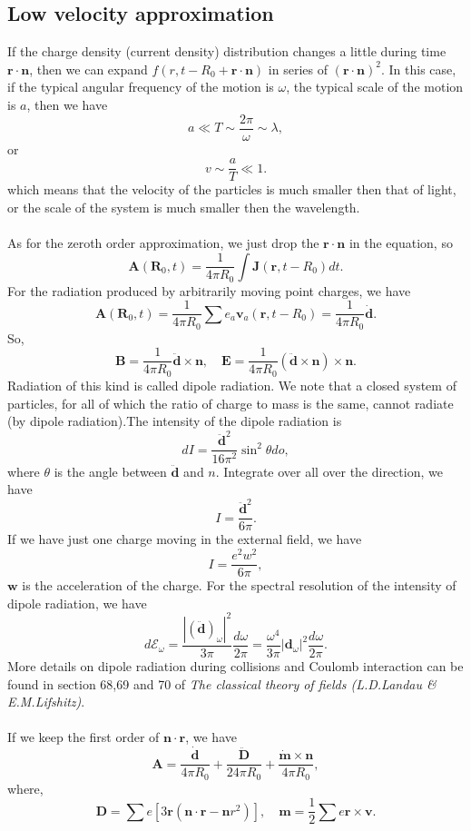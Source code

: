 \subsection{Low velocity approximation}
If the charge density (current density) distribution changes a little during time $\bm{r}\cdot\bm{n}$, then we can expand $f(r,t-R_0+\bm{r}\cdot\bm{n})$ in series of $(\bm{r}\cdot\bm{n})^2$. In this case, if the typical angular frequency of the motion is $\omega$, the typical scale of the motion is $a$, then we have
\[a \ll T \sim \frac{2\pi}{\omega} \sim \lambda,\]
or
\[v \sim \frac{a}{T} \ll 1.\]
which means that the velocity of the particles is much smaller then that of light, or the scale of the system is much smaller then the wavelength.
\\ \\
As for the zeroth order approximation, we just drop the $\bm{r}\cdot\bm{n}$ in the equation, so
\[\bm{A}(\bm{R}_0,t) = \frac{1}{4\pi R_0} \int \bm{J}(\bm{r},t-R_0) dt.\]
For the radiation produced by arbitrarily moving point charges, we have
\[\bm{A}(\bm{R}_0,t) = \frac{1}{4\pi R_0} \sum e_a \bm{v}_a(\bm{r},t-R_0) = \frac{1}{4\pi R_0} \dot{\bm{d}}.\]
So,
\[\bm{B} = \frac{1}{4\pi R_0} \ddot{\bm{d}} \times \bm{n} , \quad \bm{E} = \frac{1}{4\pi R_0} (\ddot{\bm{d}} \times \bm{n})\times \bm{n}.\]
Radiation of this kind is called dipole radiation. 
We note that a closed system of particles, for all of which the ratio of charge to mass is the same, cannot radiate (by dipole radiation).The intensity of the dipole radiation is
\[dI = \frac{\ddot{\bm{d}}^2}{16\pi^2} \sin^2\theta do,\]
where $\theta$ is the angle between $\ddot{\bm{d}}$ and $n$.
Integrate over all over the direction, we have
\[I = \frac{\ddot{\bm{d}}^2}{6\pi}.\]
If we have just one charge moving in the external field, we have
\[I = \frac{e^2 w^2}{6\pi},\]
$\bm{w}$ is the acceleration of the charge.
For the spectral resolution of the intensity of dipole radiation, we have
\[d\mathcal{E}_{\omega} = \frac{|(\ddot{\bm{d}})_{\omega}|^2}{3\pi}\frac{d\omega}{2\pi} = \frac{\omega^4}{3\pi}|\bm{d}_{\omega}|^2 \frac{d\omega}{2\pi}.\]
More details on dipole radiation during collisions and Coulomb interaction can be found in section 68,69 and 70 of \emph{The classical theory of fields (L.D.Landau \& E.M.Lifshitz)}.
\\ \\
If we keep the first order of $\bm{n}\cdot\bm{r}$, we have
\[\bm{A} = \frac{\dot{\bm{d}}}{4\pi R_0} + \frac{\ddot{\bm{D}}}{24\pi R_0} + \frac{\dot{\bm{m}}\times \bm{n}}{4\pi R_0},\]
where,
\[\bm{D} = \sum e[3\bm{r}(\bm{n}\cdot\bm{r} - \bm{n}r^2)] , \quad \bm{m} = \frac{1}{2} \sum e\bm{r}\times\bm{v}.\]
